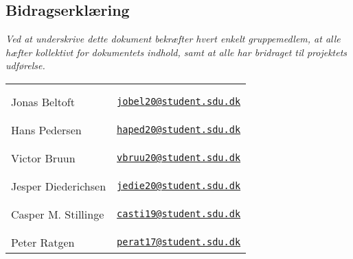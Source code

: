 \subsection{Bidragserklæring}
\textit{Ved at underskrive dette dokument bekræfter hvert enkelt gruppemedlem, at alle hæfter kollektivt for dokumentets indhold, samt at alle har bridraget til projektets udførelse.}
\bgroup
    \setlength\tabcolsep{1.2cm}
     \begin{table}[h!]
     \renewcommand{\arraystretch}{1.2}
         \centering
         \begin{tabular}{lr}
             &\\&\\\hline
             Jonas Beltoft         & \href{mailto:jobel20@student.sdu.dk}{\texttt{jobel20@student.sdu.dk}}\\
             &\\&\\\hline
             Hans Pedersen        & \href{mailto:haped20@student.sdu.dk}{\texttt{haped20@student.sdu.dk}}\\
             &\\&\\\hline
             Victor Bruun        & \href{mailto:vbruu20@student.sdu.dk}{\texttt{vbruu20@student.sdu.dk}}\\
             &\\&\\\hline
             Jesper Diederichsen & \href{mailto:jedie20@student.sdu.dk}{\texttt{jedie20@student.sdu.dk}}\\
             &\\&\\\hline
             Casper M. Stillinge   & \href{mailto:casti19@student.sdu.dk}{\texttt{casti19@student.sdu.dk}}\\
             &\\&\\\hline
             Peter Ratgen         & \href{mailto:perat17@student.sdu.dk}{\texttt{perat17@student.sdu.dk}}\\
         \end{tabular}
     \end{table}
\egroup
